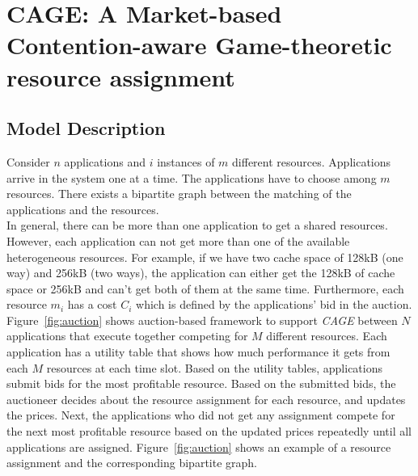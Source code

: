 \section{CAGE: A Market-based Contention-aware Game-theoretic resource assignment}\label{Problem_definition}
\subsection{Model Description}
Consider $n$ applications and $i$ instances of $m$ different resources. Applications arrive in the system one at a time. The applications have to choose among $m$ resources. There exists a bipartite graph between the matching of the applications and the resources.\\
\indent In general, there can be more than one application to get a shared resources. However, each application can not get more than one of the available heterogeneous resources. For example, if we have two cache space of 128kB (one way) and 256kB (two ways), the application can either get the 128kB of cache space or 256kB and can't get both of them at the same time. Furthermore, each resource $m_i$ has a cost $C_i$ which is defined by the applications' bid in the auction. \\
\indent Figure~\ref{fig:auction} shows auction-based framework to support \textit{CAGE} between $N$ applications that execute together competing for $M$ different resources. Each application has a utility table that shows how much performance it gets from each $M$ resources at each time slot. Based on the utility tables, applications submit bids for the most profitable resource. Based on the submitted bids, the auctioneer decides about the resource assignment for each resource, and updates the prices. Next, the applications who did not get any assignment compete for the next most profitable resource based on the updated prices repeatedly until all applications are assigned.  Figure~\ref{fig:auction} shows an example of a resource assignment and the corresponding bipartite graph.
